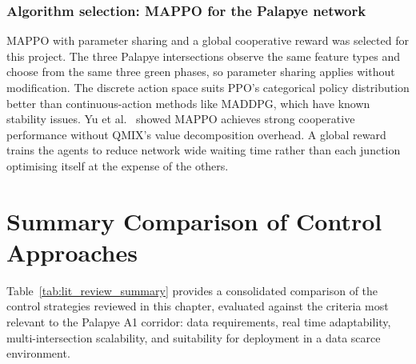 ﻿\documentclass[11pt, a4paper]{report}
\begin{document}
\subsubsection{Algorithm selection: MAPPO for the Palapye network}

MAPPO with parameter sharing and a global cooperative reward was selected for this project. The three Palapye intersections observe the same feature types and choose from the same three green phases, so parameter sharing applies without modification. The discrete action space suits PPO's categorical policy distribution better than continuous-action methods like MADDPG, which have known stability issues. Yu et al.\ \cite{yu2022surprising} showed MAPPO achieves strong cooperative performance without QMIX's value decomposition overhead. A global reward trains the agents to reduce network wide waiting time rather than each junction optimising itself at the expense of the others.

\section{Summary Comparison of Control Approaches}

Table~\ref{tab:lit_review_summary} provides a consolidated comparison of the control strategies reviewed in this chapter, evaluated against the criteria most relevant to the Palapye A1 corridor: data requirements, real time adaptability, multi-intersection scalability, and suitability for deployment in a data scarce environment.
\end{document}
